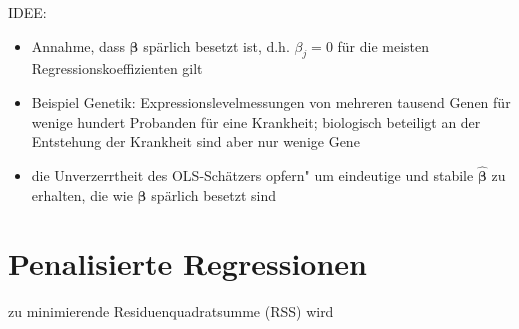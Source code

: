 \documentclass{beamer}
\begin{document}
\begin{frame}
	IDEE:
	\begin{itemize}
	\pause \item Annahme, dass $\boldsymbol{\beta}$ spärlich besetzt ist, d.h. $\beta_j=0$ für die meisten Regressionskoeffizienten gilt
	\pause \item Beispiel Genetik: Expressionslevelmessungen von mehreren tausend Genen für wenige hundert Probanden für eine Krankheit; biologisch beteiligt an der Entstehung der Krankheit sind aber nur wenige Gene
	\pause \item die Unverzerrtheit des OLS-Schätzers \glqq opfern" um eindeutige und stabile $\boldsymbol{\hat{\beta}}$ zu erhalten, die wie $\boldsymbol{\beta}$ spärlich besetzt sind
	\end{itemize}
\end{frame}


\section{Penalisierte Regressionen}
\begin{frame} %
  \item zu minimierende Residuenquadratsumme (RSS) wird 
\end{frame}
\end{document}
